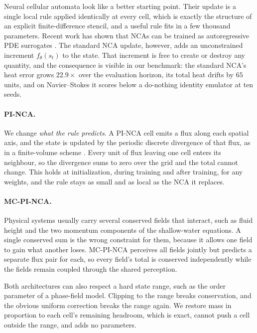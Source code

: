 \documentclass{article}
\begin{document}
Neural cellular automata \citep{mordvintsev2020growing} look like a better starting point.
Their update is a single local rule applied identically at every cell, which is exactly
the structure of an explicit finite-difference stencil, and a useful rule fits in a few
thousand parameters. Recent work has shown that NCAs can be trained as autoregressive PDE
surrogates \citep{richardson2024patterns,saha2026timestepping}. The standard NCA update,
however, adds an unconstrained increment $f_\theta(s_t)$ to the state. That increment is
free to create or destroy any quantity, and the consequence is visible in our benchmark:
the standard NCA's heat error grows $22.9\times$ over the evaluation horizon, its total
heat drifts by $65$ units, and on Navier--Stokes it scores below a do-nothing identity
emulator at ten seeds.

\paragraph{PI-NCA.} We change \emph{what the rule predicts}. A PI-NCA cell emits a flux
along each spatial axis, and the state is updated by the periodic discrete divergence of
that flux, as in a finite-volume scheme \citep{leveque2002finite}. Every unit of flux
leaving one cell enters its neighbour, so the divergence sums to zero over the grid and
the total cannot change. This holds at initialization, during training and after
training, for any weights, and the rule stays as small and as local as the NCA it
replaces.

\paragraph{MC-PI-NCA.} Physical systems usually carry several conserved fields that
interact, such as fluid height and the two momentum components of the shallow-water
equations. A single conserved sum is the wrong constraint for them, because it allows
one field to gain what another loses. MC-PI-NCA perceives all fields jointly but predicts a
separate flux pair for each, so every field's total is conserved independently while the
fields remain coupled through the shared perception.

Both architectures can also respect a hard state range, such as the order parameter of a
phase-field model. Clipping to the range breaks conservation, and the obvious uniform
correction breaks the range again. We restore mass in proportion to each cell's remaining
headroom, which is exact, cannot push a cell outside the range, and adds no parameters.
\end{document}
